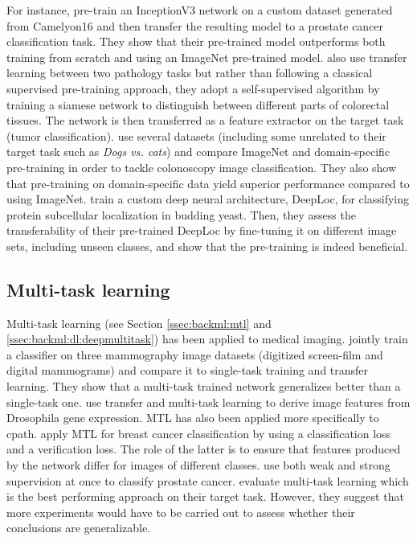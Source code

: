 For instance, \citeauthor{khan2019improving} \cite{khan2019improving} pre-train an InceptionV3 network on a custom dataset generated from Camelyon16 and then transfer the resulting model to a prostate cancer classification task. They show that their pre-trained model outperforms both training from scratch and using an ImageNet pre-trained model. \citeauthor{medela2019few} \cite{medela2019few} also use transfer learning between two pathology tasks but rather than following a classical supervised pre-training approach, they adopt a self-supervised algorithm by training a siamese network to distinguish between different parts of colorectal tissues. The network is then transferred as a feature extractor on the target task (tumor classification). \citeauthor{shang2019and} \cite{shang2019and} use several datasets (including some unrelated to their target task such as \textit{Dogs vs. cats}) and compare ImageNet and domain-specific pre-training in order to tackle colonoscopy image classification. They also show that pre-training on domain-specific data yield superior performance compared to using ImageNet. \citeauthor{kraus2017automated} \cite{kraus2017automated} train a custom deep neural architecture, DeepLoc, for classifying protein subcellular localization in budding yeast. Then, they assess the transferability of their pre-trained DeepLoc by fine-tuning it on different image sets, including unseen classes, and show that the pre-training is indeed beneficial.

\subsection{Multi-task learning}
\label{ssec:backdp:mtl}

Multi-task learning (see Section \ref{ssec:backml:mtl} and \ref{ssec:backml:dl:deepmultitask}) has been applied to medical imaging. \citeauthor{samala2017multi} \cite{samala2017multi} jointly train a classifier on three mammography image datasets (digitized screen-film and digital mammograms) and compare it to single-task training and transfer learning. They show that a multi-task trained network generalizes better than a single-task one. \citeauthor{zhang2016deep} \cite{zhang2016deep} use transfer and multi-task learning to derive image features from Drosophila gene expression. MTL has also been applied more specifically to \acrlong{cpath}. \citeauthor{pan2018multi} \cite{pan2018multi} apply MTL for breast cancer classification by using a classification loss and a verification loss. The role of the latter is to ensure that features produced by the network differ for images of different classes. \citeauthor{arvaniti2018coupling} \cite{arvaniti2018coupling} use both weak and strong supervision at once to classify prostate cancer. \citeauthor{shang2019and} \cite{shang2019and} evaluate multi-task learning which is the best performing approach on their target task. However, they suggest that more experiments would have to be carried out to assess whether their conclusions are generalizable.

